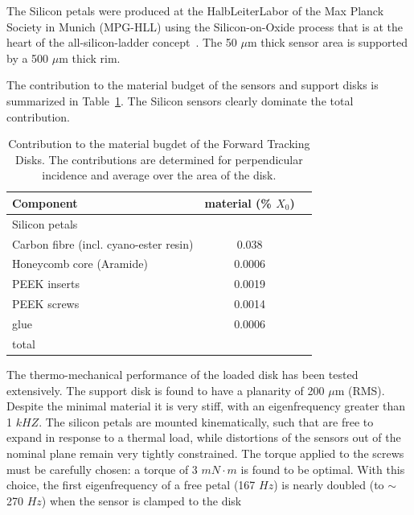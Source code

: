 The Silicon petals were produced at the HalbLeiterLabor of the Max Planck Society in 
Munich (MPG-HLL) using the Silicon-on-Oxide process that is at the heart of the
all-silicon-ladder concept~\cite{Andricek:2004cj}. The 50 $\mu \mathrm{m}$ thick sensor 
area is supported by a 500 $\mu \mathrm{m}$ thick rim.

The contribution to the material budget of the sensors and support disks is 
summarized in Table~\ref{tab:ftd_disk_material_budget}. The Silicon sensors clearly
dominate the total contribution.

\begin{table}[]
    \centering
    \begin{tabular}{l|c|c}
    Component                      & material (\% $X_0$) \\ \hline
    Silicon petals                &                   \\
    Carbon fibre (incl. cyano-ester resin)     &   0.038 \\
    Honeycomb core (Aramide)      &   0.0006 \\
    PEEK inserts                  &   0.0019 \\
    PEEK screws                   &   0.0014 \\
    glue                          &   0.0006  \\ \hline
    total                         &           \\ \hline
    \end{tabular}
    \caption{Contribution to the material bugdet of the Forward Tracking Disks. The contributions are determined for perpendicular incidence and average over the area
    of the disk.}
    \label{tab:ftd_disk_material_budget}
\end{table}

The thermo-mechanical performance of the loaded disk has been tested extensively. The 
support disk is found to have a planarity of 200 $\mu \mathrm{m}$ (RMS). Despite the 
minimal material it is very stiff, with an eigenfrequency greater than 1 $kHZ$. The
silicon petals are mounted kinematically, such that are free to expand in response
to a thermal load, while distortions of the sensors out of the nominal plane remain
very tightly constrained. The torque applied to the screws must be carefully 
chosen: a torque of 3 $mN \cdot m$ is found to be optimal. 
With this choice, the first eigenfrequency of a free petal (167 $Hz$) is nearly
doubled (to $\sim$ 270 $Hz$) when the sensor is clamped to the disk 

